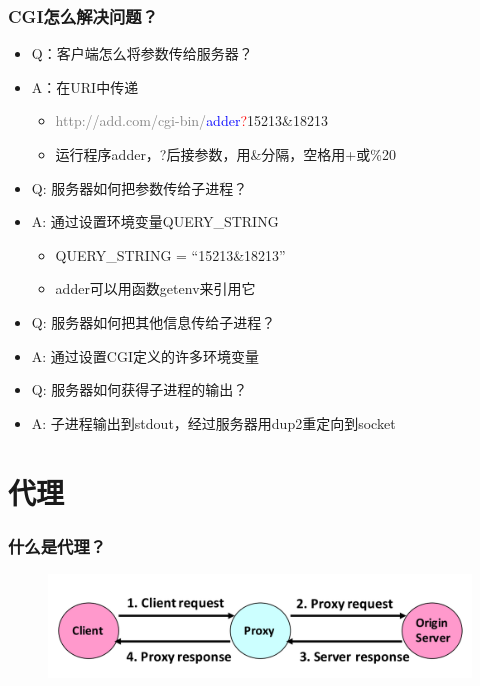 \documentclass[AutoFakeBold]{beamer}
\begin{document}
{\begin{frame}
    \end{frame}

    \begin{frame}
        \frametitle{CGI怎么解决问题？}
    
        \begin{itemize}
            \item Q：客户端怎么将参数传给服务器？
            \item A：在URI中传递\begin{itemize}
                \item \textcolor{gray}{http://add.com/cgi-bin/}\textcolor{blue}{adder}\textcolor{red}{?}\textcolor{dkgreen}{15213}\textcolor{mauve}{\&}\textcolor{dkgreen}{18213}
                \item 运行程序adder，?后接参数，用\&分隔，空格用+或\%20
            \end{itemize}
            \item Q: 服务器如何把参数传给子进程？
            \item A: 通过设置环境变量QUERY\_STRING\begin{itemize}
                \item QUERY\_STRING = “15213\&18213”
                \item adder可以用函数getenv来引用它
            \end{itemize}
            \item Q: 服务器如何把其他信息传给子进程？
            \item A: 通过设置CGI定义的许多环境变量
            \item Q: 服务器如何获得子进程的输出？
            \item A: 子进程输出到stdout，经过服务器用dup2重定向到socket
        \end{itemize}
    
    \end{frame}

    \section{代理}
    \begin{frame}
        \frametitle{什么是代理？}
    
        \begin{figure}
            \centering
            \includegraphics[width=.618\paperwidth]{figures/4.png}


\end{figure}
\end{frame}}
\end{document}
